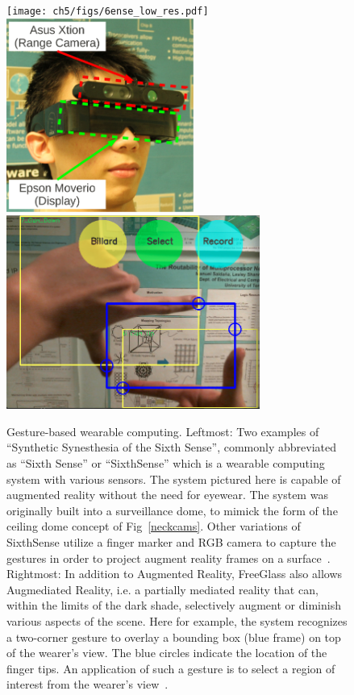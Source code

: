 \begin{figure}
\centering
{\texttt{[image: ch5/figs/6ense\_low\_res.pdf]}}
\includegraphics[height=2.5in]{ch5/figs/crop_wearable}
\includegraphics[height=2.5in]{ch5/figs/bounding_box.png} 
\caption{Gesture-based wearable computing.
Leftmost: Two examples of ``Synthetic Synesthesia of the Sixth Sense''\cite{mann2001cyborg},
commonly abbreviated as ``Sixth Sense'' or ``SixthSense'' which is a wearable
computing system with various sensors.  The system pictured here is
capable of augmented reality without the need for eyewear.
The system was originally built into a surveillance dome,
to mimick the form of the ceiling dome concept of
Fig~\protect\ref{neckcams}.
Other variations of SixthSense
utilize a finger marker and RGB camera to capture the gestures
in order to project augment reality frames
on a surface~\cite{mistry2009sixthsense}.
Rightmost: In addition to Augmented Reality,
FreeGlass also allows Augmediated Reality, i.e. a partially mediated reality
that can, within the limits of the dark shade, selectively augment or diminish
various aspects of the scene.
Here for example, the
system recognizes a two-corner gesture to overlay a bounding box (blue frame)
on top of the wearer's view. The blue circles indicate the location of the
finger tips. An application of such a gesture is to select a region
of interest from the wearer's view~\cite{lo2013augmediated}.} 
\label{bounding}
\label{6sense} 
\end{figure}

